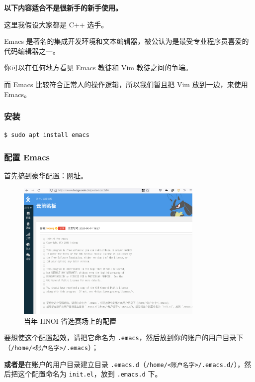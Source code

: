 \documentclass[UTF-8]{ctexart}
\begin{document}
			\textbf{以下内容适合不是很新手的新手使用。}
		
			这里我假设大家都是 C++ 选手。
			
			Emacs 是著名的集成开发环境和文本编辑器，被公认为是最受专业程序员喜爱的代码编辑器之一。
			
			你可以在任何地方看见 Emacs 教徒和 Vim 教徒之间的争端。
			
			而 Emacs 比较符合正常人的操作逻辑，所以我们暂且把 Vim 放到一边，来使用 Emacs。
		
			\subsubsection{安装}
		
				\begin{verbatim}
$ sudo apt install emacs
				\end{verbatim}
			
			\subsubsection{配置 Emacs}
			
				首先搞到豪华配置：\href{https://www.luogu.com.cn/paste/uzsz2zf4}{网址}。
				
				\begin{figure}[H]
					\centering
					\includegraphics[width=0.8\textwidth]{fig/emacs_init_el.png}
					\caption*{当年 HNOI 省选赛场上的配置}
				\end{figure}
			
				要想使这个配置起效，请把它命名为 \texttt{.emacs}，然后放到你的账户的用户目录下（\texttt{/home/<账户名字>/.emacs}）；
				
				\textbf{或者是}在账户的用户目录建立目录 \texttt{.emacs.d}（\texttt{/home/<账户名字>/.emacs.d/}），然后把这个配置命名为 \texttt{init.el}，放到 \texttt{.emacs.d} 下。
				
\end{document}
